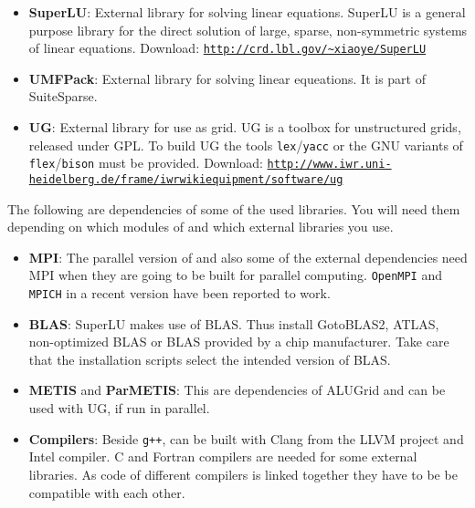 \begin{itemize}
\item \textbf{SuperLU}: External library for solving linear equations. SuperLU is a general purpose
  library for the direct solution of large, sparse, non-symmetric systems of linear equations.
  Download: \texttt{\url{http://crd.lbl.gov/~xiaoye/SuperLU}}

\item \textbf{UMFPack}: External library for solving linear equeations. It is part of SuiteSparse.

\item \textbf{UG}: External library for use as grid. UG is a toolbox for unstructured grids, released under GPL.
  To build UG the tools \texttt{lex}/\texttt{yacc} or the GNU variants of \texttt{flex}/\texttt{bison} must be provided.
  Download: \texttt{\url{http://www.iwr.uni-heidelberg.de/frame/iwrwikiequipment/software/ug}}
\end{itemize}

The following are dependencies of some of the used libraries. You will need them
depending on which modules of \Dune and which external libraries you use.

\begin{itemize}
\item \textbf{MPI}: The parallel version of \Dune and also some of the external dependencies need MPI
  when they are going to be built for parallel computing. \texttt{OpenMPI} and \texttt{MPICH} in a recent
  version have been reported to work.

\item \textbf{BLAS}: SuperLU makes use of BLAS. Thus install GotoBLAS2, ATLAS, non-optimized BLAS
  or BLAS provided by a chip manufacturer. Take care that the installation scripts select the intended
  version of BLAS.

\item \textbf{METIS} and \textbf{ParMETIS}: This are dependencies of ALUGrid and can be used with UG, if run in parallel.

\item \textbf{Compilers}: Beside \texttt{g++}, \Dune can be built with Clang from the LLVM project and
  Intel \Cplusplus compiler. C and Fortran compilers are needed for some external libraries. As code of
  different compilers is linked together they have to be be compatible with each other.
\end{itemize}